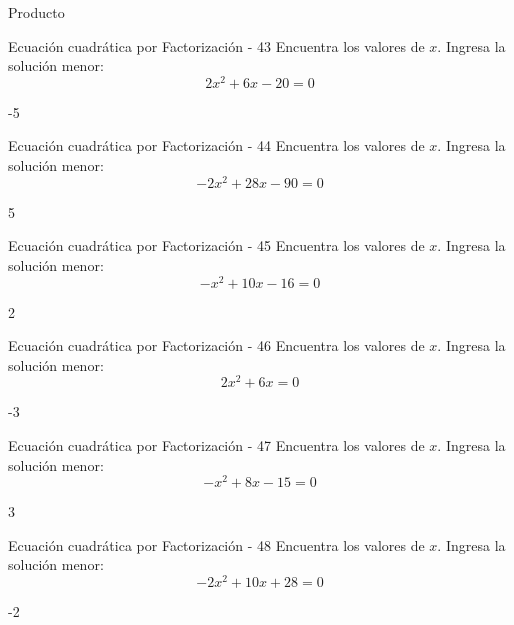 \documentclass[a4,11pt]{aleph-notas}
\begin{document}
\begin{quiz}{Producto}
\begin{numerical}[]%
    {Ecuación cuadrática por Factorización - 43}
    Encuentra los valores de $x$. Ingresa la solución menor:
    \[
        2 x^{2} + 6 x - 20 = 0
    \]
    \item[] -5
\end{numerical}

\begin{numerical}[]%
    {Ecuación cuadrática por Factorización - 44}
    Encuentra los valores de $x$. Ingresa la solución menor:
    \[
        - 2 x^{2} + 28 x - 90 = 0
    \]
    \item[] 5
\end{numerical}

\begin{numerical}[]%
    {Ecuación cuadrática por Factorización - 45}
    Encuentra los valores de $x$. Ingresa la solución menor:
    \[
        - x^{2} + 10 x - 16 = 0
    \]
    \item[] 2
\end{numerical}

\begin{numerical}[]%
    {Ecuación cuadrática por Factorización - 46}
    Encuentra los valores de $x$. Ingresa la solución menor:
    \[
        2 x^{2} + 6 x = 0
    \]
    \item[] -3
\end{numerical}

\begin{numerical}[]%
    {Ecuación cuadrática por Factorización - 47}
    Encuentra los valores de $x$. Ingresa la solución menor:
    \[
        - x^{2} + 8 x - 15 = 0
    \]
    \item[] 3
\end{numerical}

\begin{numerical}[]%
    {Ecuación cuadrática por Factorización - 48}
    Encuentra los valores de $x$. Ingresa la solución menor:
    \[
        - 2 x^{2} + 10 x + 28 = 0
    \]
    \item[] -2
\end{numerical}


\end{quiz}
\end{document}
